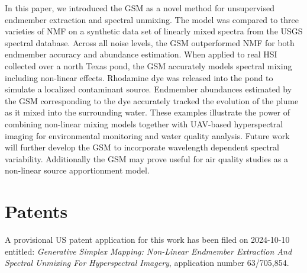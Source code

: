 \documentclass[remotesensing,article,submit,pdftex,moreauthors]{Definitions/mdpi}
\begin{document}
In this paper, we introduced the GSM as a novel method for unsupervised endmember extraction and spectral unmixing. The model was compared to three varieties of NMF on a synthetic data set of linearly mixed spectra from the USGS spectral database. Across all noise levels, the GSM outperformed NMF for both endmember accuracy and abundance estimation. When applied to real HSI collected over a north Texas pond, the GSM accurately models spectral mixing including non-linear effects. Rhodamine dye was released into the pond to simulate a localized contaminant source. Endmember abundances estimated by the GSM corresponding to the dye accurately tracked the evolution of the plume as it mixed into the surrounding water. These examples illustrate the power of combining non-linear mixing models together with UAV-based hyperspectral imaging for environmental monitoring and water quality analysis. Future work will further develop the GSM to incorporate wavelength dependent spectral variability. Additionally the GSM may prove useful for air quality studies as a non-linear source apportionment model.


\section{Patents}
A provisional US patent application for this work has been filed on 2024-10-10 entitled: \textit{Generative Simplex Mapping: Non-Linear Endmember Extraction And Spectral Unmixing For Hyperspectral Imagery}, application number 63/705,854.


\vspace{6pt} 




\end{document}
